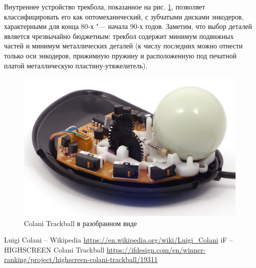 \documentclass[11pt, a4paper]{article}
\begin{document}
Внутреннее устройство трекбола, показанное на рис. \ref{fig:ColaniInside}, позволяет классифицировать его как оптомеханический, с зубчатыми дисками энкодеров, характерными для конца 80-х "--- начала 90-х годов. Заметим, что выбор деталей является чрезвычайно бюджетным: трекбол содержит минимум подвижных частей и минимум металлических деталей (к числу последних можно отнести только оси энкодеров, прижимную пружину и расположенную под печатной платой металлическую пластину-утяжелитель).

\begin{figure}[h]
    \centering
    \includegraphics[scale=0.8]{1993_colani_trackball/inside_30.jpg}
    \caption{Colani Trackball в разобранном виде}
    \label{fig:ColaniInside}
\end{figure}

\begin{thebibliography}{9}
     Luigi Colani – Wikipedia \url{https://en.wikipedia.org/wiki/Luigi_Colani}
     iF – HIGHSCREEN Colani Trackball \url{https://ifdesign.com/en/winner-ranking/project/highscreen-colani-trackball/19311}
\end{thebibliography}
\end{document}
